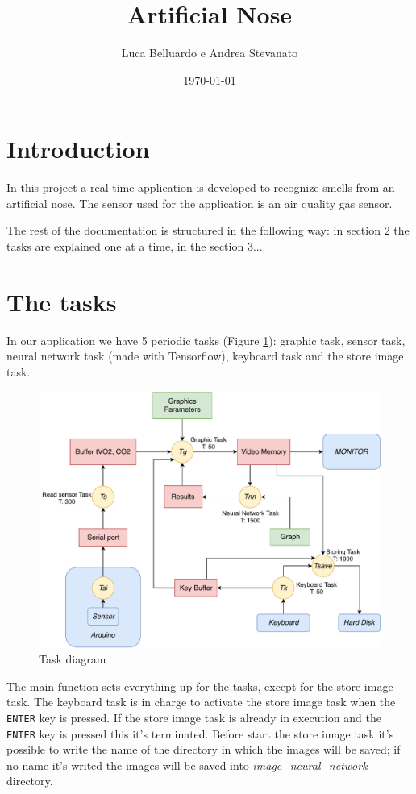 \documentclass[12pt]{article}
\title{Artificial Nose}
\author{Luca Belluardo e Andrea Stevanato}
\date{\today}
\begin{document}
\maketitle

\section{Introduction}
In this project a real-time application is developed to recognize smells from an
artificial nose. The sensor used for the application is an air quality gas 
sensor.

The rest of the documentation is structured in the following way: in section
2 the tasks are explained one at a time, in the section 3...

\section{The tasks}
In our application we have 5 periodic tasks (Figure \ref{tdiagram}): graphic
task, sensor task, neural network task (made with Tensorflow), keyboard task
and the store image task.

\begin{figure}[!b]
    \includegraphics[width=\textwidth]{diagram.pdf}
    \caption{Task diagram}
    \label{tdiagram}
\end{figure}

The main function sets everything up for the tasks, except for the store
image task. The keyboard task is in charge to activate the store image task
when the \texttt{ENTER} key is pressed. If the store image task is already in
execution and the \texttt{ENTER} key is pressed this it's terminated.
Before start the store image task it's possible to write the name of the
directory in which the images will be saved; if no name it's writed the
images will be saved into \textit{image\_neural\_network} directory.
\end{document}
